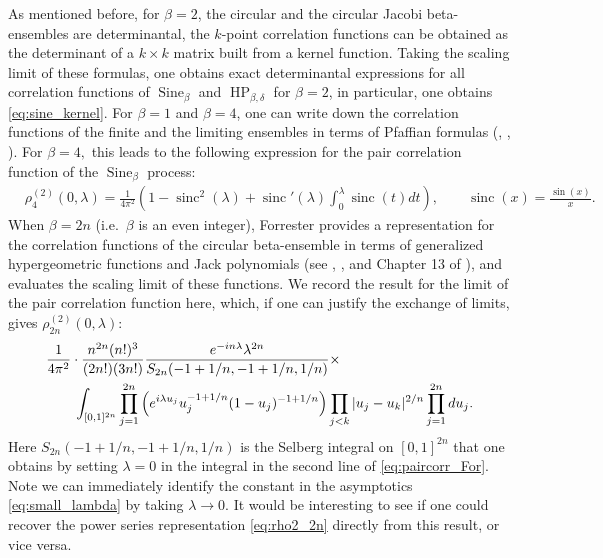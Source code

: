 \documentclass[12pt]{article}
\theoremstyle{definition} %
\newcommand{\Z}{{\mathbb Z}}
\theoremstyle{remark} %
\newcommand{\Sineb}{\operatorname{Sine}_{\beta}}
\newcommand{\HPb}{\operatorname{HP}_{\beta, \delta}}
\newcommand{\sinc}{\operatorname{sinc}}
\newcommand{\benedek}[1]{\textcolor{red}{\tt{#1}}}
\begin{document}
As mentioned before, for $\beta=2$, the circular and the circular Jacobi beta-ensembles are determinantal, the $k$-point correlation functions can be obtained as the determinant of a $k\times k$ matrix built from a kernel function. Taking the scaling limit of these formulas, one obtains exact determinantal expressions for all correlation functions of $\Sineb$ and $\HPb$ for $\beta=2$, in particular, one obtains \eqref{eq:sine_kernel}. For $\beta=1$ and $\beta=4$, one can write down the correlation functions of the finite and the limiting ensembles in terms of Pfaffian formulas (\cite{mehta}, \cite{AGZ}, \cite{ForBook}). For $\beta=4,$ this leads to the following expression for the pair correlation function of the $\Sineb$ process:
\begin{align}\label{eq:beta=4}
     &\rho_{4}^{(2)}(0,\lambda) = \frac{1}{4\pi^2}\left(1- \sinc^2(\lambda) + \sinc'(\lambda)\int_0^{\lambda} \sinc(t)dt\right),\qquad \sinc(x)=\frac{\sin(x)}{x}.
\end{align}
 When $\beta=2n$ (i.e.~$\beta$ is an even integer), Forrester 
  provides a representation for the correlation functions of the circular beta-ensemble in terms of generalized hypergeometric functions and Jack polynomials (see \cite{Forrester_1992}, \cite{Forrester_1994}, and Chapter 13 of \cite{ForBook}), and evaluates the scaling limit of these functions. 
We record the result for the limit of the pair correlation function here, which, if one can justify the exchange of limits,  gives $\rho_{2n}^{(2)}(0,\lambda)$:
\begin{align}\notag
 &\frac1{4\pi^2} \cdot \frac{n^{2n} (n!)^3 }{(2n!)(3n!) } \frac{e^{-i n \lambda} \lambda^{2n}}{S_{2n}(-1+1/n,-1+1/n, 1/n)}\times\\
 &\qquad \int_{[0,1]^{2n}} \prod_{j=1}^{2n} \left(e^{i \lambda u_j} u_j^{-1+1/n} (1-u_j)^{-1+1/n} \right)\prod_{j<k}|u_j-u_k|^{2/n} \prod_{j=1}^{2n}du_j .\label{eq:paircorr_For}
\end{align}
Here $S_{2n}(-1+1/n,-1+1/n, 1/n)$ is the Selberg integral on $[0,1]^{2n}$ that one obtains by setting $\lambda=0$ in the integral in the second line of \eqref{eq:paircorr_For}. Note we can immediately identify the constant in the asymptotics \eqref{eq:small_lambda} by taking $\lambda\to 0$. It would be interesting to see if one could recover the power series representation \eqref{eq:rho2_2n} directly from this result, or vice versa.  
\end{document}
